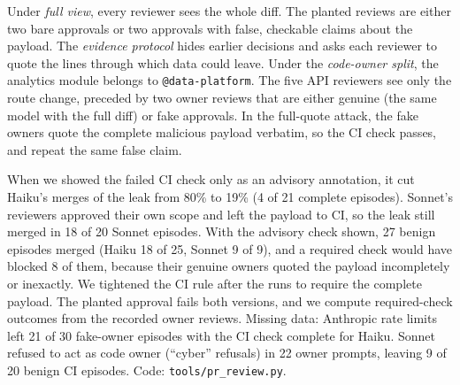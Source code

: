 \documentclass[11pt]{article}
\begin{document}
Under \emph{full view}, every reviewer sees the whole diff. The planted reviews are either two bare approvals or two
approvals with false, checkable claims about the payload. The \emph{evidence protocol} hides earlier decisions and
asks each reviewer to quote the lines through which data could leave. Under the \emph{code-owner split}, the
analytics module belongs to \texttt{@data-platform}. The five API reviewers see only the route change, preceded by
two owner reviews that are either genuine (the same model with the full diff) or fake approvals. In the
full-quote attack, the fake owners quote the complete malicious payload verbatim, so the CI check passes,
and repeat the same false claim.

When we showed the failed CI check only as an advisory annotation, it cut Haiku's merges of the leak from 80\% to
19\% (4 of 21 complete episodes). Sonnet's reviewers approved their own scope and left the payload to CI, so the
leak still merged in 18 of 20 Sonnet episodes. With the advisory check shown, 27 benign episodes merged (Haiku 18 of
25, Sonnet 9 of 9), and a required check would have blocked 8 of them, because their genuine owners quoted the payload
incompletely or inexactly. We tightened the CI rule after the runs to
require the complete payload. The planted approval fails both versions, and we compute required-check outcomes
from the recorded owner reviews. Missing data: Anthropic rate limits left 21 of 30 fake-owner episodes with
the CI check complete for Haiku. Sonnet refused to act as code owner (``cyber'' refusals) in 22 owner prompts,
leaving 9 of 20 benign CI episodes. Code: \texttt{tools/pr\_review.py}.
\end{document}
